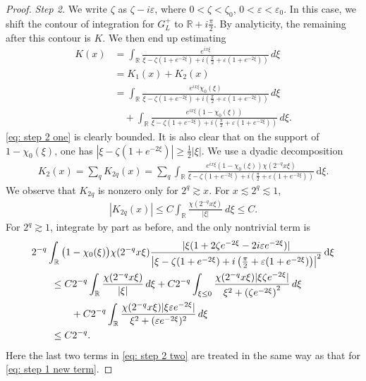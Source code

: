\documentclass[GreensFunctions.tex]{subfiles}
\begin{document}
\begin{proof}
	{\em Step 2.} 
	We write $\zeta$ as $\zeta-i\varepsilon$, where $0<\zeta<\zeta_0$, 
	$0<\varepsilon <\varepsilon_0$. In this case, we shift the contour 
	of integration for $G_L^+$ to ${\mathbb R} + i\frac\pi 2$. By analyticity,
	the remaining after this contour is $K$. We then end up estimating
	\begin{align}
		K(x) 
			&= 
				\int_{\mathbb R} 
					\frac{e^{ix\xi}}
						{
							\xi-\zeta(1+e^{-2\xi})
							+i
							\left(
								\frac\pi2 + \varepsilon(1+e^{-2\xi})
							\right)
						}
				\,d\xi
				\\
			&= K_1(x) + K_2(x)\\
			&= 
				\int_{\mathbb R} 
					\frac{e^{ix\xi}\chi_0(\xi)}
						{
							\xi-\zeta(1+e^{-2\xi})
							+i
							\left(
								\frac\pi2 + \varepsilon(1+e^{-2\xi})
							\right)
						}
				\,d\xi 
				\label{eq: step 2 one} \\
			&\quad+
				\int_{\mathbb R} 
					\frac{e^{ix\xi}(1-\chi_0(\xi))}
						{
							\xi-\zeta(1+e^{-2\xi})
							+i
							\left(
								\frac\pi2 + \varepsilon(1+e^{-2\xi})
							\right)
						}
				\,d\xi.
	\end{align}
	\eqref{eq: step 2 one} is clearly bounded. It is also clear that on the support of 
	$1-\chi_0(\xi)$, one has $|\xi-\zeta(1+e^{-2\xi})|\ge \frac12|\xi|$. We use a 
	dyadic decomposition 
	\begin{align*}
		K_2(x) 
			= \sum_q K_{2q}(x) 
			= \sum_q 
				\int_{\mathbb R} 
					\frac{e^{ix\xi}(1-\chi_0(\xi))\chi(2^{-q}x\xi)}
						{
							\xi-\zeta(1+e^{-2\xi})
							+i
							\left(
								\frac\pi2 + \varepsilon(1+e^{-2\xi})
							\right)
						}
				\, \mathrm{d}\xi.
	\end{align*}
	We observe that $K_{2q}$ is nonzero only for $2^q\gtrsim x$. For 
	$x\lesssim 2^q\lesssim 1$,
	\begin{align*}
		|K_{2q}(x)|\le C\int_{\mathbb R} \frac{\chi(2^{-q}x\xi)}{|\xi|}~d\xi\le C.
	\end{align*}
	For $2^q\gtrsim 1$, integrate by part as before, and the only nontrivial term is
	\begin{align}
		&2^{-q}
		\int_{\mathbb R} 
			\big(1-\chi_0(\xi)\big)\chi(2^{-q}x\xi)
			\frac{|\xi(1+2\zeta e^{-2\xi} -2i\varepsilon e^{-2\xi})|}
				{
					\left|
						\xi-\zeta(1+e^{-2\xi})
						+i
						\left(
							\frac\pi2 + \varepsilon(1+e^{-2\xi})
						\right)
					\right|^2
				}
		\, \mathrm{d}\xi 
		\notag \\
		&\qquad\le 
			C2^{-q}
				\int_{\mathbb R} 
					\frac{\chi(2^{-q}x\xi)}{|\xi|}
				\,d\xi 
				+ C2^{-q}
				\int_{\xi\le 0}
					\frac{\chi(2^{-q}x\xi)|\xi\zeta e^{-2\xi}|}
						{\xi^2 + \left(\zeta e^{-2\xi}\right)^2}
				\,d\xi\notag\\
		&\qquad\qquad
			+ C2^{-q}
			\int_{\mathbb R}
				\frac{\chi(2^{-q}x\xi)|\xi\varepsilon e^{-2\xi}|}
					{\xi^2 + (\varepsilon e^{-2\xi})^2}
			\,d\xi \label{eq: step 2 two}\\
		&\qquad\le C2^{-q}.
			\notag
	\end{align}
	Here the last two terms in \eqref{eq: step 2 two} are treated in the same way as that 
	for \eqref{eq: step 1 new term}.



\end{proof}
\end{document}
